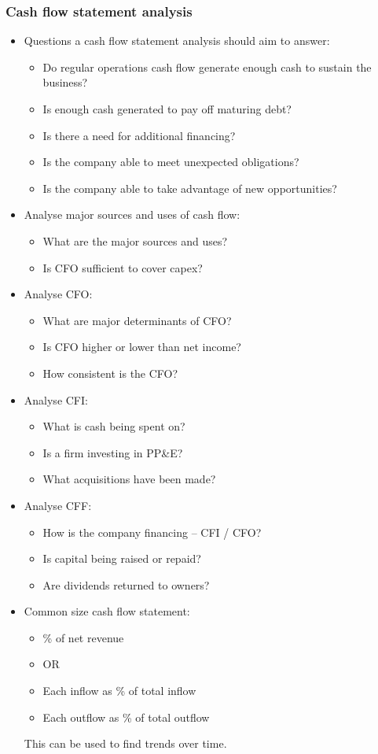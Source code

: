 \documentclass[../notes_compiled.tex]{subfiles}
\begin{document}
\subsubsection{Cash flow statement analysis}
\begin{itemize}
\item Questions a cash flow statement analysis should aim to answer:
\begin{itemize}
\item Do regular operations cash flow generate enough cash to sustain the business?
\item Is enough cash generated to pay off maturing debt?
\item Is there a need for additional financing?
\item Is the company able to meet unexpected obligations?
\item Is the company able to take advantage of new opportunities?
\end{itemize}

\item Analyse major sources and uses of cash flow:
\begin{itemize}
\item What are the major sources and uses?
\item Is CFO sufficient to cover capex?
\end{itemize}

\item Analyse CFO:
\begin{itemize}
\item What are major determinants of CFO?
\item Is CFO higher or lower than net income?
\item How consistent is the CFO?
\end{itemize}

\item Analyse CFI:
\begin{itemize}
\item What is cash being spent on?
\item Is a firm investing in PP\&E?
\item What acquisitions have been made?
\end{itemize}

\item Analyse CFF:
\begin{itemize}
\item How is the company financing -- CFI / CFO?
\item Is capital being raised or repaid?
\item Are dividends returned to owners?
\end{itemize}

\item Common size cash flow statement:
\begin{itemize}
\item \% of net revenue
\item[] OR
\item Each inflow as \% of total inflow
\item Each outflow as \% of total outflow
\end{itemize}
This can be used to find trends over time.
\end{itemize}
\end{document}
